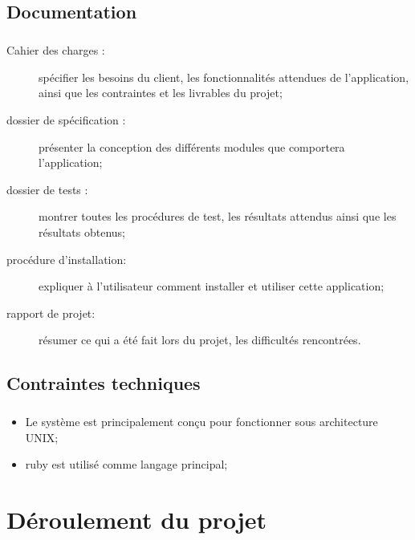 \section{Documentation}
        \paragraph*{}
        \begin{description}
                \item[Cahier des charges :] spécifier les besoins du client, les fonctionnalités attendues de l’application, ainsi que les contraintes et les livrables du projet;
                \item[dossier de spécification :] présenter la conception des différents modules que comportera l’application;
                \item[dossier de tests :] montrer toutes les procédures de test, les résultats attendus ainsi que les résultats obtenus;
                \item[procédure d'installation:] expliquer à l’utilisateur comment installer et utiliser cette application;
                \item[rapport de projet:] résumer ce qui a été fait lors du projet, les difficultés rencontrées.
        \end{description}


\section{Contraintes techniques}
        \paragraph*{}
        \begin{itemize}
                \item Le système est principalement conçu pour fonctionner sous architecture UNIX;%
                \item ruby est utilisé comme langage principal;
        \end{itemize}


\chapter{Déroulement du projet}


